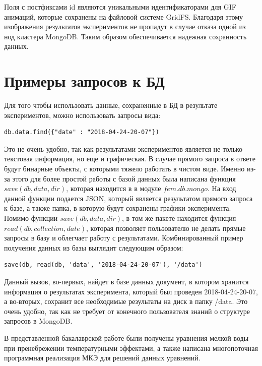 \documentclass[14pt]{extreport}
\begin{document}
Поля с постфиксами id являются уникальными идентификаторами для GIF анимаций, которые сохранены на файловой системе GridFS. Благодаря этому изображения результатов экспериментов не пропадут в случае отказа одной из нод кластера MongoDB. Таким образом обеспечивается надежная сохранность данных.

\section{Примеры запросов к БД}
Для того чтобы использовать данные, сохраненные в БД в результате экспериментов, можно использовать запросы вида:

\begin{lstlisting}
db.data.find({"date" : "2018-04-24-20-07"})
\end{lstlisting}

Это не очень удобно, так как результатами экспериментов является не только текстовая информация, но еще и графическая. В случае прямого запроса в ответе будут бинарные объекты, с которыми тяжело работать в чистом виде. Именно из-за этого для более простой работы с базой данных была написана функция $save(db, data, dir)$, которая находится в в модуле $fem.db.mongo$. На вход данной функции подается JSON, который является результатом прямого запроса к базе, а также папка, в которую будут сохранены графики эксперимента. Помимо функции $save(db, data, dir)$, в том же пакете находится функция $read(db, collection, date)$, которая позволяет пользователю не делать прямые запросы в базу и облегчает работу с результатами. Комбинированный пример получения данных из базы выглядит следующим образом:

\begin{lstlisting}
save(db, read(db, 'data', '2018-04-24-20-07'), '/data')
\end{lstlisting}

Данный вызов, во-первых, найдет в базе данных документ, в котором хранится информация о результатах эксперимента, который был проведен 2018-04-24-20-07, а во-вторых, сохранит все необходимые результаты на диск в папку /data. Это очень удобно, так как не требует от конечного пользователя знаний о структуре запросов в MongoDB. 


\conclusions

В представленной бакалаврской работе были получены уравнения мелкой воды при пренебрежении температурными эффектами, а также написана многопоточная программная реализация МКЭ для решений данных уравнений.
\end{document}
